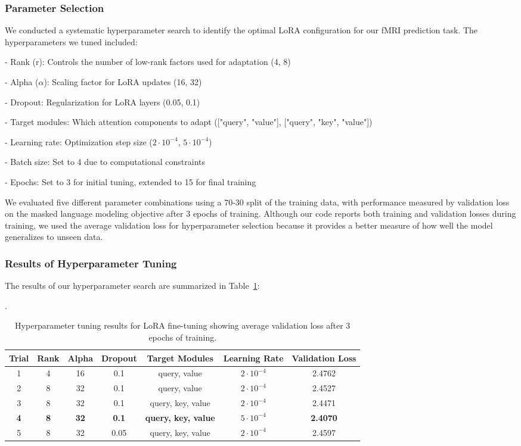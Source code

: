 \documentclass[12pt,letterpaper]{article}
\begin{document}
\subsubsection{Parameter Selection}
We conducted a systematic hyperparameter search to identify the optimal LoRA configuration for our fMRI prediction task. The hyperparameters we tuned included:

- Rank (r): Controls the number of low-rank factors used for adaptation (4, 8)

- Alpha ($\alpha$): Scaling factor for LoRA updates (16, 32)

- Dropout: Regularization for LoRA layers (0.05, 0.1)

- Target modules: Which attention components to adapt (["query", "value"], ["query", "key", "value"])

- Learning rate: Optimization step size ($2 \cdot 10^{-4}$, $5 \cdot 10^{-4}$)

- Batch size: Set to 4 due to computational constraints

- Epochs: Set to 3 for initial tuning, extended to 15 for final training


We evaluated five different parameter combinations using a 70-30 split of the training data, with performance measured by validation loss on the masked language modeling objective after 3 epochs of training. Although our code reports both training and validation losses during training, we used the average validation loss for hyperparameter selection because it provides a better measure of how well the model generalizes to unseen data.

\subsubsection{Results of Hyperparameter Tuning}

The results of our hyperparameter search are summarized in Table~\ref{tab:lora_results}:


\begin{table}[H]
\centering
\caption{Hyperparameter tuning results for LoRA fine-tuning showing average validation loss after 3 epochs of training.}
.
\label{tab:lora_results}
\begin{tabular}{|c|c|c|c|c|c|c|}
\hline
\textbf{Trial} & \textbf{Rank} & \textbf{Alpha} & \textbf{Dropout} & \textbf{Target Modules} & \textbf{Learning Rate} & \textbf{Validation Loss} \\
\hline
1 & 4 & 16 & 0.1 & query, value & $2 \cdot 10^{-4}$ & 2.4762 \\
\hline
2 & 8 & 32 & 0.1 & query, value & $2 \cdot 10^{-4}$ & 2.4527 \\
\hline
3 & 8 & 32 & 0.1 & query, key, value & $2 \cdot 10^{-4}$ & 2.4471 \\
\hline
\textbf{4} & \textbf{8} & \textbf{32} & \textbf{0.1} & \textbf{query, key, value} & \textbf{\boldmath $5 \cdot 10^{-4}$} & \textbf{2.4070} \\
\hline
5 & 8 & 32 & 0.05 & query, key, value & $2 \cdot 10^{-4}$ & 2.4597 \\
\hline
\end{tabular}
\end{table}
\end{document}
